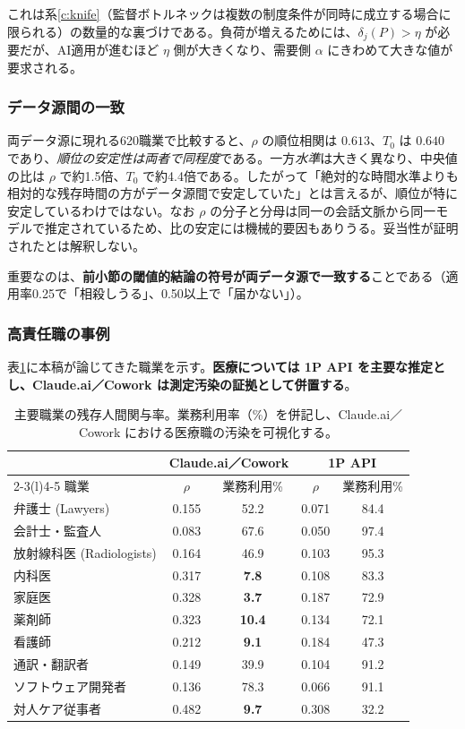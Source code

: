 \documentclass[11pt]{article}
\theoremstyle{plain}
\theoremstyle{definition}
\theoremstyle{remark}
\begin{document}
これは系\ref{c:knife}（監督ボトルネックは複数の制度条件が同時に成立する場合に限られる）の数量的な裏づけである。負荷が増えるためには、$\delta_j(P)>\eta$ が必要だが、AI適用が進むほど $\eta$ 側が大きくなり、需要側 $\alpha$ にきわめて大きな値が要求される。

\subsubsection{データ源間の一致}
両データ源に現れる620職業で比較すると、$\rho$ の順位相関は $0.613$、$T_0$ は $0.640$ であり、\emph{順位の安定性は両者で同程度}である。一方\emph{水準}は大きく異なり、中央値の比は $\rho$ で約1.5倍、$T_0$ で約4.4倍である。したがって「絶対的な時間水準よりも相対的な残存時間の方がデータ源間で安定していた」とは言えるが、順位が特に安定しているわけではない。なお $\rho$ の分子と分母は同一の会話文脈から同一モデルで推定されているため、比の安定には機械的要因もありうる。妥当性が証明されたとは解釈しない。

重要なのは、\textbf{前小節の閾値的結論の符号が両データ源で一致する}ことである（適用率0.25で「相殺しうる」、0.50以上で「届かない」）。

\subsubsection{高責任職の事例}
表\ref{tab:aei-occ}に本稿が論じてきた職業を示す。\textbf{医療については 1P API を主要な推定とし、Claude.ai／Cowork は測定汚染の証拠として併置する}。

\begin{table}[h]\centering\small
\caption{主要職業の残存人間関与率。業務利用率（\%）を併記し、Claude.ai／Cowork における医療職の汚染を可視化する。}\label{tab:aei-occ}
\begin{tabularx}{\textwidth}{@{}Xcccc@{}}
\toprule
 & \multicolumn{2}{c}{Claude.ai／Cowork} & \multicolumn{2}{c}{1P API} \\
\cmidrule(r){2-3}\cmidrule(l){4-5}
職業 & $\rho$ & 業務利用\% & $\rho$ & 業務利用\% \\ \midrule
弁護士 (Lawyers) & 0.155 & 52.2 & 0.071 & 84.4 \\
会計士・監査人 & 0.083 & 67.6 & 0.050 & 97.4 \\
放射線科医 (Radiologists) & 0.164 & 46.9 & 0.103 & 95.3 \\
内科医 & 0.317 & \textbf{7.8} & 0.108 & 83.3 \\
家庭医 & 0.328 & \textbf{3.7} & 0.187 & 72.9 \\
薬剤師 & 0.323 & \textbf{10.4} & 0.134 & 72.1 \\
看護師 & 0.212 & \textbf{9.1} & 0.184 & 47.3 \\
通訳・翻訳者 & 0.149 & 39.9 & 0.104 & 91.2 \\
ソフトウェア開発者 & 0.136 & 78.3 & 0.066 & 91.1 \\
対人ケア従事者 & 0.482 & \textbf{9.7} & 0.308 & 32.2 \\
\bottomrule
\end{tabularx}
\end{table}
\end{document}
